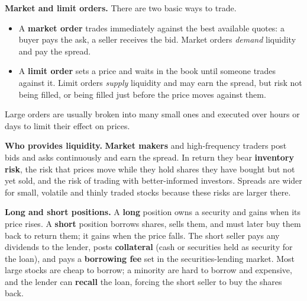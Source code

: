 
\textbf{Market and limit orders.} There are two basic ways to trade.

\begin{itemize}
  \item A \textbf{market order} trades immediately against the best available quotes: a buyer pays the ask, a seller receives the bid. Market orders \emph{demand} liquidity and pay the spread.
  \item A \textbf{limit order} sets a price and waits in the book until someone trades against it. Limit orders \emph{supply} liquidity and may earn the spread, but risk not being filled, or being filled just before the price moves against them.
\end{itemize}

Large orders are usually broken into many small ones and executed over hours or days to limit their effect on prices.

\textbf{Who provides liquidity.} \textbf{Market makers} and high-frequency traders post bids and asks continuously and earn the spread. In return they bear \textbf{inventory risk}, the risk that prices move while they hold shares they have bought but not yet sold, and the risk of trading with better-informed investors. Spreads are wider for small, volatile and thinly traded stocks because these risks are larger there.

\textbf{Long and short positions.} A \textbf{long} position owns a security and gains when its price rises. A \textbf{short} position borrows shares, sells them, and must later buy them back to return them; it gains when the price falls. The short seller pays any dividends to the lender, posts \textbf{collateral} (cash or securities held as security for the loan), and pays a \textbf{borrowing fee} set in the securities-lending market. Most large stocks are cheap to borrow; a minority are hard to borrow and expensive, and the lender can \textbf{recall} the loan, forcing the short seller to buy the shares back.

